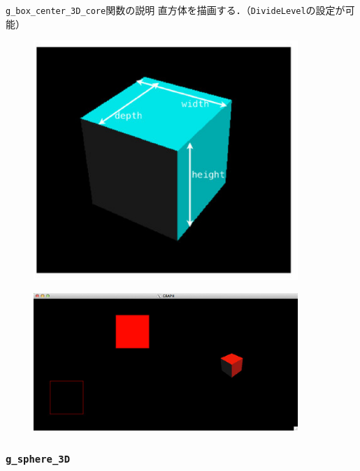 \documentclass[platex,a4paper,12pt]{jsarticle}%
\begin{document}
\begin{itembox}[l]{\texttt{g\_box\_center\_3D\_core}関数の説明}
直方体を描画する．（\verb|DivideLevel|の設定が可能）
\end{itembox}
\begin{figure}[htb]
\centering
\includegraphics[width=100mm]{Canvas_g_box.eps}
\end{figure}

\begin{figure}[htb]
\centering
\includegraphics[width=100mm]{Canvas_g_box2.eps}
\end{figure}




\clearpage
\subsubsection{\texttt{g\_sphere\_3D}}
\end{document}
